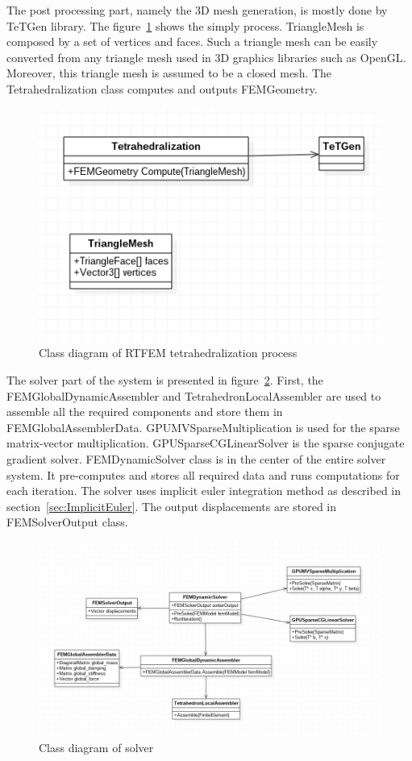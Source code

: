 \documentclass[en]{minipw} %
\begin{document}
The post processing part, namely the 3D mesh generation, is mostly done by TeTGen library. The figure~\ref{fig:uml_tetrahedralization} shows the simply process. TriangleMesh is composed by a set of vertices and faces. Such a triangle mesh can be easily converted from any triangle mesh used in 3D graphics libraries such as OpenGL. Moreover, this triangle mesh is assumed to be a closed mesh. The Tetrahedralization class computes and outputs FEMGeometry.

\begin{figure}[h!]
\centering
\includegraphics[scale=0.6]{pictures/tetrahedralization.png}
\caption[Class diagram of RTFEM tetrahedralization process]{Class diagram of RTFEM tetrahedralization process}
\label{fig:uml_tetrahedralization}
\end{figure}

The solver part of the system is presented in figure~\ref{fig:uml_solver}. First, the FEMGlobalDynamicAssembler and TetrahedronLocalAssembler are used to assemble all the required components and store them in FEMGlobalAssemblerData. GPUMVSparseMultiplication is used for the sparse matrix-vector multiplication. GPUSparseCGLinearSolver is the sparse conjugate gradient solver. FEMDynamicSolver class is in the center of the entire solver system. It pre-computes and stores all required data and runs computations for each iteration. The solver uses implicit euler integration method as described in section~\ref{sec:ImplicitEuler}. The output displacements are stored in FEMSolverOutput class.

\begin{figure}[h!]
\centering
\includegraphics[scale=0.5]{pictures/solver.png}
\caption[Class diagram of solver]{Class diagram of solver}
\label{fig:uml_solver}
\end{figure}
\end{document}
